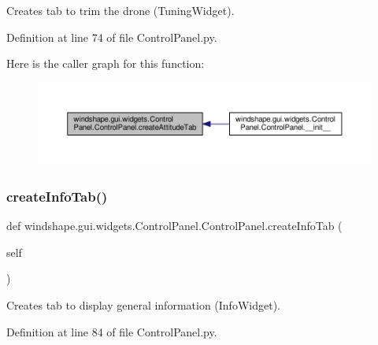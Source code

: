 \begin{DoxyVerb}Creates tab to trim the drone (TuningWidget).\end{DoxyVerb}
 

Definition at line 74 of file Control\+Panel.\+py.

Here is the caller graph for this function\+:\nopagebreak
\begin{figure}[H]
\begin{center}
\leavevmode
\includegraphics[width=350pt]{classwindshape_1_1gui_1_1widgets_1_1_control_panel_1_1_control_panel_a60f1e1548d1f79aac6f474c0beaabbfa_icgraph}
\end{center}
\end{figure}
\mbox{\label{classwindshape_1_1gui_1_1widgets_1_1_control_panel_1_1_control_panel_af7ffe8727031aa36ee612fe6b2e44e8f}} 
\subsubsection{\texorpdfstring{create\+Info\+Tab()}{createInfoTab()}}
{\footnotesize\ttfamily def windshape.\+gui.\+widgets.\+Control\+Panel.\+Control\+Panel.\+create\+Info\+Tab (\begin{DoxyParamCaption}\item[{}]{self }\end{DoxyParamCaption})}

\begin{DoxyVerb}Creates tab to display general information (InfoWidget).\end{DoxyVerb}
 

Definition at line 84 of file Control\+Panel.\+py.

